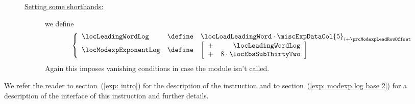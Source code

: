 \begin{description}
\begin{description}
\[						%
					\]
				\item[\underline{Setting some shorthands:}] 
					we define
					\[
						\left\{ \begin{array}{lcl}
							\locLeadingWordLog    & \define & \locLoadLeadingWord \cdot \miscExpDataCol{5}_{i + \prcModexpLeadRowOffset} \\
							\locModexpExponentLog & \define &
							\left[ \begin{array}{cr}
								+ & \locLeadingWordLog \\
								+ & 8 \cdot \locEbsSubThirtyTwo           \\
							\end{array} \right] \\
						\end{array} \right.
					\]
				\saNote{} Again this imposes vanishing conditions in case the \expMod{} module isn't called.
			\end{description}
		\end{description}
		\saNote{} We refer the reader to 
		section~(\ref{exp: intro}) for the description of the \expInstModexpLog{} instruction and to
		section~(\ref{exp: modexp log base 2}) for a description of the interface of this instruction and further details.

